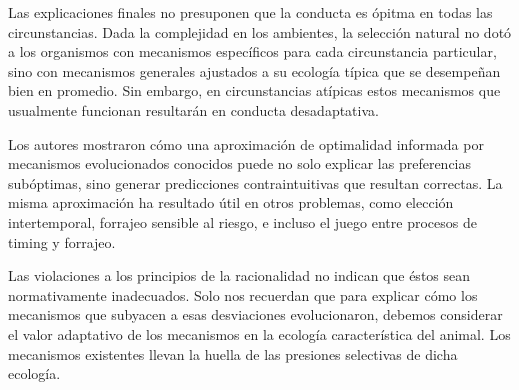 \documentclass[a4paper,12pt]{article}
\begin{document}
Las explicaciones finales no presuponen que la conducta es ópitma en todas las circunstancias. Dada la complejidad en los ambientes, la selección natural no dotó a los organismos con mecanismos específicos para cada circunstancia particular, sino con mecanismos generales ajustados a su ecología típica que se desempeñan bien en promedio. Sin embargo, en circunstancias atípicas estos mecanismos que usualmente funcionan resultarán en conducta desadaptativa.

Los autores mostraron cómo una aproximación de optimalidad informada por mecanismos evolucionados conocidos puede no solo explicar las preferencias subóptimas, sino generar predicciones contraintuitivas que resultan correctas. La misma aproximación ha resultado útil en otros problemas, como elección intertemporal, forrajeo sensible al riesgo, e incluso el juego entre procesos de timing y forrajeo.

Las violaciones a los principios de la racionalidad no indican que éstos sean normativamente inadecuados. Solo nos recuerdan que para explicar cómo los mecanismos que subyacen a esas desviaciones evolucionaron, debemos considerar el valor adaptativo de los mecanismos en la ecología característica del animal. Los mecanismos existentes llevan la huella de las presiones selectivas de dicha ecología.
\end{document}
